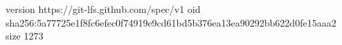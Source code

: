 version https://git-lfs.github.com/spec/v1
oid sha256:5a77725e1f8fc6efec0f74919e9cd61bd5b376ea13ea90292bb622d0fe15aaa2
size 1273
